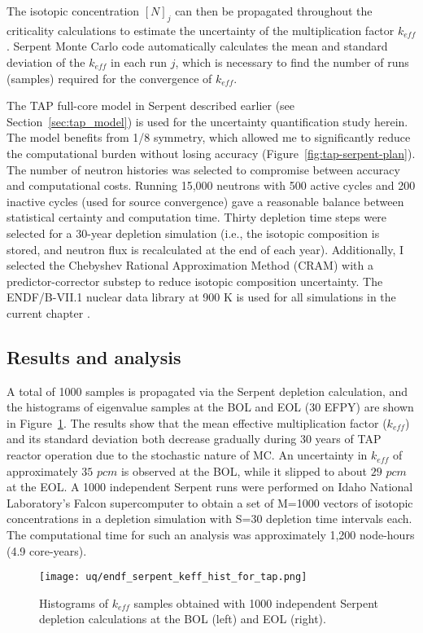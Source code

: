 The isotopic concentration $[N]_j$ can then be propagated throughout the 
criticality calculations to estimate the uncertainty of the multiplication 
factor $k_{eff}$. Serpent Monte Carlo code automatically calculates the mean 
and standard deviation of the $k_{eff}$ in each run $j$, which is 
necessary to find the number of runs (samples) required for the convergence of 
$k_{eff}$.

The \gls{TAP} full-core model in Serpent described earlier (see  
Section~\ref{sec:tap_model}) is used for the uncertainty quantification study 
herein. The model benefits from 1/8 symmetry, which allowed me to 
significantly reduce the computational burden without losing accuracy
(Figure~\ref{fig:tap-serpent-plan}). The number of neutron histories was 
selected to compromise between accuracy and computational costs. Running 
15,000 neutrons with 500 active cycles and 200 inactive cycles 
(used for source convergence) gave a reasonable balance between statistical 
certainty and computation time. Thirty depletion time steps were 
selected for a 30-year depletion simulation (i.e., the isotopic composition is 
stored, and neutron flux is recalculated at the end of each year). 
Additionally, I selected the Chebyshev Rational Approximation Method (CRAM) 
with a predictor-corrector substep \cite{pusa_computing_2010} to reduce 
isotopic 
composition uncertainty. The ENDF/B-VII.1 nuclear data library at 900 K is 
used for all simulations in the current chapter 
\cite{chadwick_endf/b-vii.1_2011}.

\subsection{Results and analysis}
A total of 1000 samples is propagated via the Serpent depletion calculation,  
and the histograms of eigenvalue samples at the \gls{BOL} and \gls{EOL} (30 
\gls{EFPY}) are shown in Figure~\ref{fig:uq-serp-keff-hist}. The 
results show that the mean effective multiplication factor ($k_{eff}$) 
and its standard deviation both decrease gradually during 30 years of 
\gls{TAP} reactor operation due to the stochastic nature of \gls{MC}. 
An uncertainty in $k_{eff}$ of approximately $35$ $pcm$ is observed at the 
\gls{BOL}, while it slipped to about $29$ $pcm$ at the \gls{EOL}. A 1000 
independent Serpent runs were performed on Idaho National Laboratory's Falcon 
supercomputer to obtain a set of M=1000 vectors of isotopic concentrations in 
a depletion simulation with S=30 depletion time intervals each. The 
computational time for such an analysis was approximately 1,200 node-hours 
(4.9 core-years).
\begin{figure}[htp!] %
	\centering
	\texttt{[image: uq/endf\_serpent\_keff\_hist\_for\_tap.png]}
	\vspace{-4mm}
	\caption{Histograms of $k_{eff}$ samples obtained with 1000 independent 
		Serpent depletion calculations at the \gls{BOL} (left) and \gls{EOL} 
		(right).}
	\label{fig:uq-serp-keff-hist}
\end{figure}

